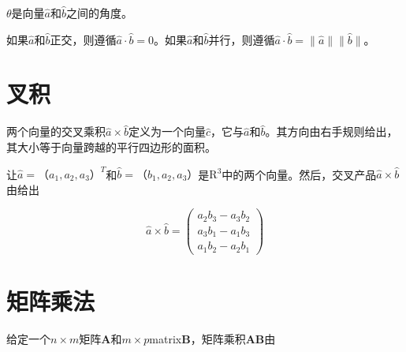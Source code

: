 
$\theta$是向量$\hat{a}$和$\hat{b}$之间的角度。

如果$\hat{a}$和$\hat{b}$正交，则遵循$\hat{a}\cdot\hat{b}=0$。如果$\hat{a}$和$\hat{b}$并行，则遵循$\hat{a}\cdot\hat{b}=\|\hat{a}\|\|\hat{b}\|$。



\section{叉积}
两个向量的交叉乘积$\hat{a}\times\hat{b}$定义为一个向量$\hat{c}$，它与$\hat{a}$和$\hat{b}$。其方向由右手规则给出，其大小等于向量跨越的平行四边形的面积。

让$\hat{a}=（a_1,a_2,a_3）^T$和$\hat{b}=（b_1,a_2,a_3）$是$\mathrm{R}^3$中的两个向量。然后，交叉产品$\hat{a}\times\hat{b}$由给出

\begin{equation}
\hat{a}\times\hat{b}=\left(
\begin{array}{l}
a_2b_3-a_3b_2\\
a_3b_1-a_1b_3\\
a_1b_2-a_2b_1
\end{array}
\right)
\end{equation}



\section{矩阵乘法}
给定一个$n\times m$矩阵$\mathbf{A}$和$m\times p$matrix$\mathbf{B}$，矩阵乘积$\mathbf{AB}$由

